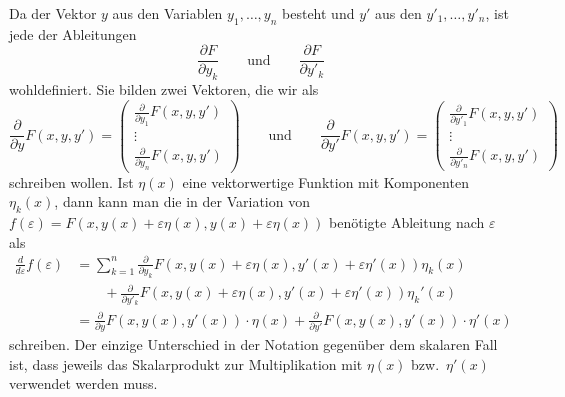 Da der Vektor $y$ aus den Variablen $y_1,\dots,y_n$ besteht und $y'$
aus den $y'_1,\dots,y'_n$, ist jede der Ableitungen
\[
\frac{\partial F}{\partial y_k}
\qquad\text{und}\qquad
\frac{\partial F}{\partial y'_k}
\]
wohldefiniert.
Sie bilden zwei Vektoren, die wir als
\begin{equation}
\frac{\partial}{\partial y}
F(x,y,y')
=
\begin{pmatrix}
\frac{\partial}{\partial y_1}F(x,y,y')\\
\vdots\\
\frac{\partial}{\partial y_n}F(x,y,y')
\end{pmatrix}
\qquad\text{und}\qquad
\frac{\partial}{\partial y'} F(x,y,y')
=
\begin{pmatrix}
\frac{\partial}{\partial y'_1}F(x,y,y')\\
\vdots\\
\frac{\partial}{\partial y'_n}F(x,y,y')
\end{pmatrix}
\end{equation}
schreiben wollen.
Ist $\eta(x)$ eine vektorwertige Funktion mit Komponenten
$\eta_k(x)$, dann kann man die in der Variation von
$f(\varepsilon) = F(x,y(x)+\varepsilon\eta(x),y(x)+\varepsilon\eta(x))$
benötigte Ableitung nach $\varepsilon$ als
\begin{align*}
\frac{d}{d\varepsilon}f(\varepsilon)
&=
\sum_{k=1}^n
\frac{\partial}{\partial y_k}
F(x,y(x)+\varepsilon\eta(x),y'(x)+\varepsilon\eta'(x))
\eta_k(x)
\\
&\qquad
+
\frac{\partial}{\partial y'_k}
F(x,y(x)+\varepsilon\eta(x),y'(x)+\varepsilon\eta'(x))
\eta_k'(x)
\\
&=
\frac{\partial}{\partial y}
F(x,y(x),y'(x))\cdot \eta(x)
+
\frac{\partial}{\partial y'}
F(x,y(x),y'(x))\cdot \eta'(x)
\end{align*}
schreiben.
Der einzige Unterschied in der Notation gegenüber dem skalaren Fall
ist, dass jeweils das Skalarprodukt zur Multiplikation mit $\eta(x)$
bzw.~$\eta'(x)$ verwendet werden muss.

%
%

